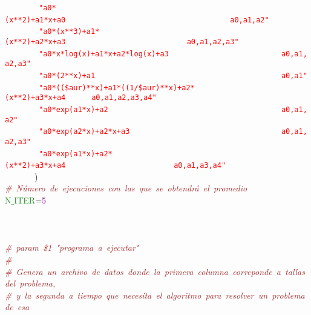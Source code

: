 \mbox{}\ \ \ \ \ \ \ \ \texttt{\textcolor{Red}{"{}a0*(x**2)+a1*x+a0\ \ \ \ \ \ \ \ \ \ \ \ \ \ \ \ \ \ \ \ \ \ \ \ \ \ \ \ \ \ \ \ \ \ \ \ \ \ a0,a1,a2"{}}}\ \ \ \ \ \  \\
\mbox{}\ \ \ \ \ \ \ \ \texttt{\textcolor{Red}{"{}a0*(x**3)+a1*(x**2)+a2*x+a3\ \ \ \ \ \ \ \ \ \ \ \ \ \ \ \ \ \ \ \ \ \ \ \ \ \ \ \ a0,a1,a2,a3"{}}} \\
\mbox{}\ \ \ \ \ \ \ \ \texttt{\textcolor{Red}{"{}a0*x*log(x)+a1*x+a2*log(x)+a3\ \ \ \ \ \ \ \ \ \ \ \ \ \ \ \ \ \ \ \ \ \ \ \ \ \ a0,a1,a2,a3"{}}} \\
\mbox{}\ \ \ \ \ \ \ \ \texttt{\textcolor{Red}{"{}a0*(2**x)+a1\ \ \ \ \ \ \ \ \ \ \ \ \ \ \ \ \ \ \ \ \ \ \ \ \ \ \ \ \ \ \ \ \ \ \ \ \ \ \ \ \ \ \ a0,a1"{}}} \\
\mbox{}\ \ \ \ \ \ \ \ \texttt{\textcolor{Red}{"{}a0*((\$aur)**x)+a1*((1/\$aur)**x)+a2*(x**2)+a3*x+a4\ \ \ \ \ \ a0,a1,a2,a3,a4"{}}} \\
\mbox{}\ \ \ \ \ \ \ \ \texttt{\textcolor{Red}{"{}a0*exp(a1*x)+a2\ \ \ \ \ \ \ \ \ \ \ \ \ \ \ \ \ \ \ \ \ \ \ \ \ \ \ \ \ \ \ \ \ \ \ \ \ \ \ \ a0,a1,a2"{}}} \\
\mbox{}\ \ \ \ \ \ \ \ \texttt{\textcolor{Red}{"{}a0*exp(a2*x)+a2*x+a3\ \ \ \ \ \ \ \ \ \ \ \ \ \ \ \ \ \ \ \ \ \ \ \ \ \ \ \ \ \ \ \ \ \ \ a0,a1,a2,a3"{}}} \\
\mbox{}\ \ \ \ \ \ \ \ \texttt{\textcolor{Red}{"{}a0*exp(a1*x)+a2*(x**2)+a3*x+a4\ \ \ \ \ \ \ \ \ \ \ \ \ \ \ \ \ \ \ \ \ \ \ \ \ a0,a1,a3,a4"{}}}\  \\
\mbox{}\ \ \ \ \ \ \ \textcolor{BrickRed}{)} \\
\mbox{}\textit{\textcolor{Brown}{\#\ Número\ de\ ejecuciones\ con\ las\ que\ se\ obtendrá\ el\ promedio}} \\
\mbox{}\textcolor{ForestGreen}{N$\_$ITER}\textcolor{BrickRed}{=}\textcolor{Purple}{5} \\
\mbox{} \\
\mbox{} \\
\mbox{} \\
\mbox{}\textit{\textcolor{Brown}{\#\ param\ \$1\ "{}programa\ a\ ejecutar"{}}} \\
\mbox{}\textit{\textcolor{Brown}{\#}} \\
\mbox{}\textit{\textcolor{Brown}{\#\ Genera\ un\ archivo\ de\ datos\ donde\ la\ primera\ columna\ correponde\ a\ tallas\ del\ problema,}} \\
\mbox{}\textit{\textcolor{Brown}{\#\ y\ la\ segunda\ a\ tiempo\ que\ necesita\ el\ algoritmo\ para\ resolver\ un\ problema\ de\ esa}} \\
